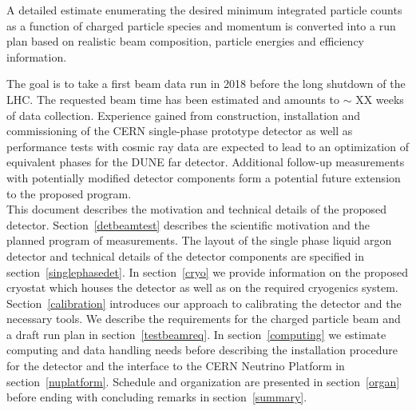 A detailed estimate enumerating the desired minimum integrated particle counts as a function
of charged particle species and momentum is converted into a run plan based on realistic beam composition, particle energies and efficiency information. 

The goal is to take a first beam data run in 2018 before the long shutdown of the LHC. 
The requested beam time has been estimated and amounts to {\color{red} $\sim$ XX weeks} of data collection. 
Experience gained from construction, installation and commissioning of the CERN single-phase prototype detector 
as well as performance tests with cosmic ray data are expected to lead to an optimization of equivalent phases 
for the DUNE far detector. 
Additional follow-up measurements with potentially modified detector components form a potential future extension 
to the proposed program.\\

This document describes the motivation and technical details of the proposed detector. Section~\ref{detbeamtest} describes the scientific motivation and the planned program of measurements. The layout of the single phase liquid argon detector and technical details of the detector components are specified in section~\ref{singlephasedet}. In section~\ref{cryo} we provide information on the proposed cryostat which houses the detector as well as on the required cryogenics system. Section~\ref{calibration} introduces our approach to calibrating the detector and the necessary tools. We describe the requirements for the charged particle beam and a draft run plan in section~\ref{testbeamreq}.
In section~\ref{computing} we estimate computing and data handling needs before describing the installation procedure for the detector
and the interface to the CERN Neutrino Platform in section~\ref{nuplatform}. Schedule and organization are presented in section~\ref{organ} before
ending with concluding remarks in section~\ref{summary}.







%






